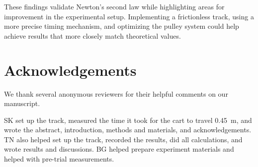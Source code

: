 ﻿\documentclass[reprint,amsmath,amssymb,aps,twoside]{revtex4-2}
\begin{document}
These findings validate Newton’s second law while highlighting areas for improvement in the experimental setup. Implementing a frictionless track, using a more precise timing mechanism, and optimizing the pulley system could help achieve results that more closely match theoretical values.




\section{Acknowledgements}
We thank several anonymous reviewers for their helpful comments on our manuscript. 

SK set up the track, measured the time it took for the cart to travel \qty{0.45}{\meter}, and wrote the abstract, introduction, methods and materials, and acknowledgements. TN also helped set up the track, recorded the results, did all calculations, and wrote results and discussions. BG helped prepare experiment materials and helped with pre-trial measurements. 





%

\end{document}
